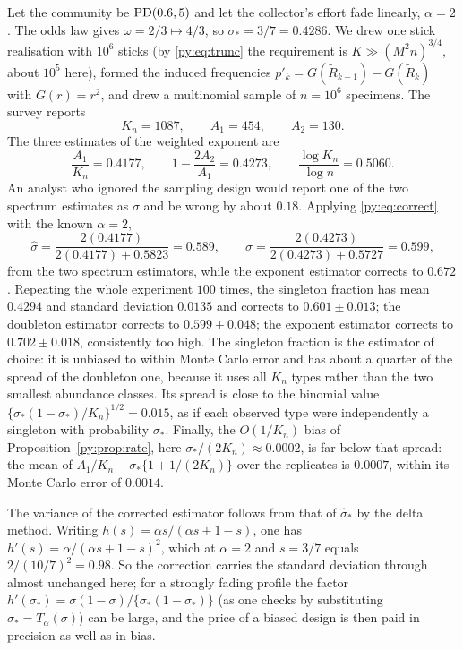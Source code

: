 \begin{example}
\label{py:ex:estimate}
Let the community be $\mathrm{PD}(0.6, 5)$ and let the collector's effort fade linearly, $\alpha = 2$. The
odds law gives $\omega = 2/3 \mapsto 4/3$, so $\sigma_* = 3/7 = 0.4286$. We drew one stick
realisation with $10^{6}$ sticks (by \eqref{py:eq:trunc} the requirement is
$K \gg (M^{2}n)^{3/4}$, about $10^{5}$ here), formed the induced frequencies
$p'_k = G(\widetilde R_{k-1}) - G(\widetilde R_k)$ with $G(r) = r^{2}$, and drew a multinomial sample
of $n = 10^{6}$ specimens. The survey reports
\[
K_n = 1087, \qquad A_1 = 454, \qquad A_2 = 130 .
\]
The three estimates of the weighted exponent are
\[
\frac{A_1}{K_n} = 0.4177, \qquad 1 - \frac{2A_2}{A_1} = 0.4273, \qquad
\frac{\log K_n}{\log n} = 0.5060 .
\]
An analyst who ignored the sampling design would report one of the two spectrum estimates as $\sigma$ and be wrong by
about $0.18$. Applying \eqref{py:eq:correct} with the known $\alpha = 2$,
\[
\hat\sigma = \frac{2(0.4177)}{2(0.4177) + 0.5823} = 0.589,
\qquad
\hat\sigma = \frac{2(0.4273)}{2(0.4273) + 0.5727} = 0.599,
\]
from the two spectrum estimators, while the exponent estimator corrects to $0.672$. Repeating the
whole experiment $100$ times, the singleton fraction has mean $0.4294$ and standard deviation
$0.0135$ and corrects to $0.601 \pm 0.013$; the doubleton estimator corrects to
$0.599 \pm 0.048$; the exponent estimator corrects to $0.702 \pm 0.018$, consistently too high. The
singleton fraction is the estimator of choice: it is unbiased to within Monte Carlo error and has about a
quarter of the spread of the doubleton one, because it uses all $K_n$ types rather than the two
smallest abundance classes. Its spread is close to the binomial value
$\{\sigma_*(1-\sigma_*)/K_n\}^{1/2} = 0.015$, as if each observed type were independently a
singleton with probability $\sigma_*$. Finally, the $O(1/K_n)$ bias of
Proposition~\ref{py:prop:rate}, here $\sigma_*/(2K_n) \approx 0.0002$, is far below that spread: the
mean of $A_1/K_n - \sigma_*\{1+1/(2K_n)\}$ over the replicates is $0.0007$, within its Monte Carlo
error of $0.0014$.
\end{example}

The variance of the corrected estimator follows from that of $\hat\sigma_*$ by the delta method.
Writing $h(s) = \alpha s/(\alpha s + 1 - s)$, one has $h'(s) = \alpha/(\alpha s+1-s)^{2}$, which at
$\alpha = 2$ and $s = 3/7$ equals $2/(10/7)^{2} = 0.98$. So the correction carries the standard
deviation through almost unchanged here; for a strongly fading profile the factor
$h'(\sigma_*) = \sigma(1-\sigma)/\{\sigma_*(1-\sigma_*)\}$ (as one checks by substituting
$\sigma_* = T_\alpha(\sigma)$) can be large, and the price of a biased design is then paid in
precision as well as in bias.

